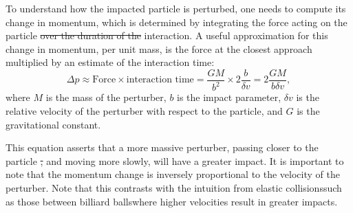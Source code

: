 \documentclass{aa} %
\providecommand{\DIFaddtex}[1]{{\protect\color{blue}\uwave{#1}}} %
\providecommand{\DIFdeltex}[1]{{\protect\color{red}\sout{#1}}}                      %
\providecommand{\DIFaddbegin}{} %
\providecommand{\DIFaddend}{} %
\providecommand{\DIFdelbegin}{} %
\providecommand{\DIFdelend}{} %
\providecommand{\DIFadd}[1]{\texorpdfstring{\DIFaddtex{#1}}{#1}} %
\providecommand{\DIFdel}[1]{\texorpdfstring{\DIFdeltex{#1}}{}} %
\begin{document}
    To understand how the impacted particle is perturbed, one needs to compute its change in momentum, which is determined by integrating the force acting on the particle \DIFdelbegin \DIFdel{over the duration of the }\DIFdelend \DIFaddbegin \DIFadd{throughout the }\DIFaddend interaction. A useful approximation for this change in momentum, per unit mass, is the force at the closest approach multiplied by an estimate of the interaction time:
    \begin{equation} \label{eq:change_in_momentum} \Delta p \approx \text{Force} \times \text{interaction time} = \frac{GM}{b^2} \times 2\frac{b}{\delta v} = 2\frac{GM}{b \delta v}, \end{equation}where $M$ is the mass of the perturber, $b$ is the impact parameter, $\delta v$ is the relative velocity of the perturber with respect to the particle, and $G$ is the gravitational constant. 


    This equation asserts that a more massive perturber, passing closer to the particle \DIFdelbegin \DIFdel{, }\DIFdelend and moving more slowly, will have a greater impact. It is important to note that the momentum change is inversely proportional to the velocity of the perturber. Note that this contrasts with the intuition from elastic collisions\DIFaddbegin \DIFadd{, }\DIFaddend such as those between billiard balls\DIFaddbegin \DIFadd{, }\DIFaddend where higher velocities result in greater impacts.
\end{document}

